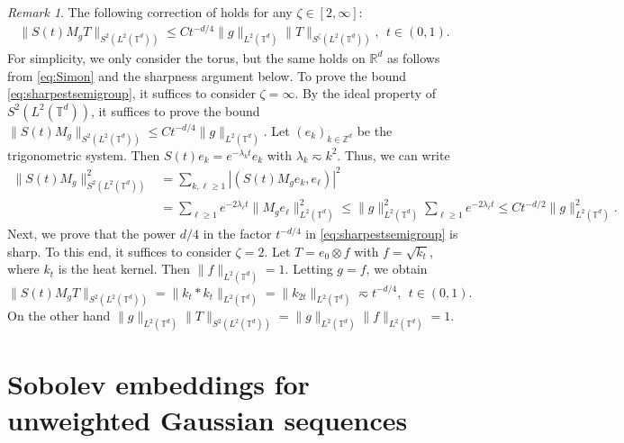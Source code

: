 \documentclass[reqno]{amsart}
\theoremstyle{plain}
\theoremstyle{remark}
\newtheorem{remark}[theorem]{Remark}
\theoremstyle{plain}
\numberwithin{equation}{section}
\def\Z{{\mathbb Z}}
\def\R{{\mathbb R}}
\newcommand{\T}{\mathbb{T}}
\newcommand{\1}{\one}
\begin{document}
\begin{remark}
\label{r:schatter_and_heat_eq}
The following correction of \cite[(3.14)]{C03} holds for any $\zeta\in [2, \infty]$:
\begin{align}\label{eq:sharpestsemigroup}
\|S(t) M_g T\|_{S^2(L^2(\T^d))}\leq C t^{-d/4} \|g\|_{L^2(\T^d)} \|T\|_{S^\zeta(L^2(\T^d))}, \ \ t\in (0,1).
\end{align}
For simplicity, we only consider the torus, but the same holds on $\R^d$ as follows from \eqref{eq:Simon} and the sharpness argument below. To prove the bound \eqref{eq:sharpestsemigroup}, it suffices to consider $\zeta=\infty$. By the ideal property of $S^2(L^2(\T^d))$, it suffices to prove the bound $\|S(t) M_g\|_{S^2(L^2(\T^d))}\leq C t^{-d/4}\|g\|_{L^2(\T^d)}$. Let $(e_k)_{k\in \Z^d}$ be the trigonometric system. Then $S(t) e_{k} = e^{-\lambda_{k} t}e_k$ with $\lambda_k\eqsim k^2$. Thus, we can write 
\begin{align*}
\|S(t) M_g\|_{S^2(L^2(\T^d))}^2 &= \sum_{k,\ell\geq 1}  |(S(t) M_g e_k, e_{\ell})|^2 
 \\ & = \sum_{\ell\geq 1} e^{-2\lambda_{\ell} t} \|M_g e_{\ell}\|_{L^2(\T^d)}^2 
 \leq \|g\|_{L^2(\T^d)}^2 \sum_{\ell\geq 1} e^{-2\lambda_{\ell} t} 
 \leq C t^{-d/2} \|g\|_{L^2(\T^d)}^2.
\end{align*}
Next, we prove that the power $d/4$ in the factor $t^{-d/4}$ in \eqref{eq:sharpestsemigroup} is sharp. To this end, it suffices to consider $\zeta=2$.  Let $T = e_0\otimes f$ with $f = \sqrt{k_t}$, where $k_t$ is the heat kernel. Then $\|f\|_{L^2(\T^d)} = 1$. Letting $g = f$, we obtain
\[\|S(t) M_g T\|_{S^2(L^2(\T^d))} = \|k_t* k_t\|_{L^2(\T^d)} = \|k_{2t}\|_{L^2(\T^d)}\eqsim t^{-d/4}, \ \ t\in (0,1).\]
On the other hand $\|g\|_{L^2(\T^d)} \|T\|_{S^2(L^2(\T^d))} = \|g\|_{L^2(\T^d)}\|f\|_{L^2(\T^d)} =1$. 
\end{remark}






\section{Sobolev embeddings for unweighted Gaussian sequences}
\label{s:weight_necessary}
\end{document}

